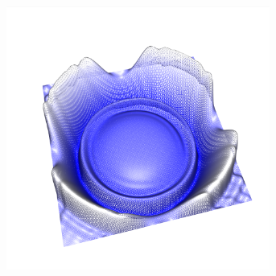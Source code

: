 \documentclass[crop=false,10pt,ngerman]{standalone}
\begin{document}
\begin{figure}[h]
\begin{subfigure}[b]{0.24\textwidth}
          \caption{}
        \end{subfigure}
        \begin{subfigure}[b]{0.24\textwidth}
          \center
          \includegraphics[trim={2cm 1.5cm 1.2cm 1.0cm},clip,width=0.95\textwidth]{images/quad_wave_3.png}
          \caption{}
        \end{subfigure}


\end{figure}
\end{document}

